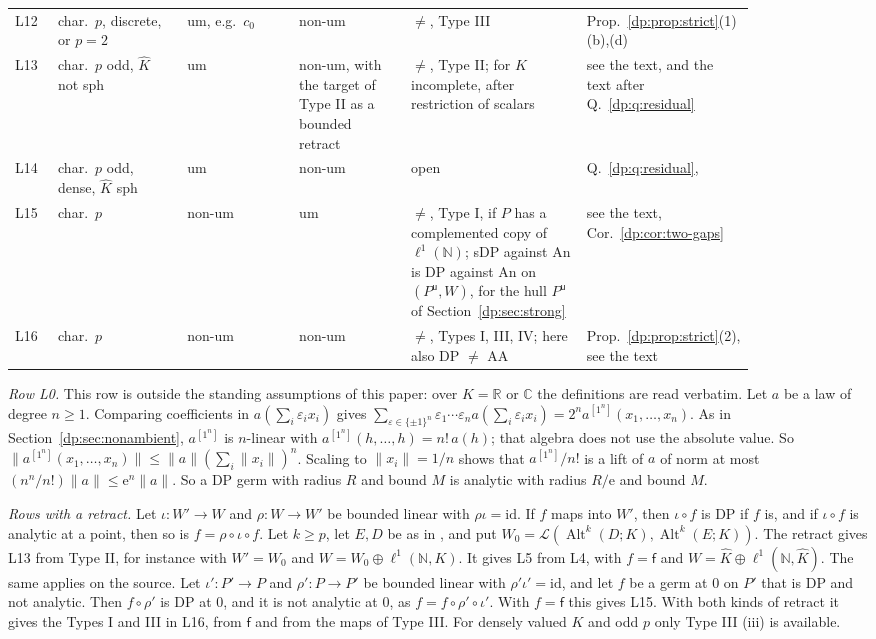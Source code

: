 \documentclass[11pt]{amsart}
\theoremstyle{definition}
\theoremstyle{remark}
\numberwithin{equation}{section}
\newcommand{\N}{\mathbb N}
\newcommand{\cL}{\mathcal L}
\newcommand{\Alt}{\operatorname{Alt}}
\newcommand{\id}{\mathrm{id}}
\newcommand{\norm}[1]{\lVert #1\rVert}
\newcommand{\Kh}{\widehat K}
\theoremstyle{plain}
\theoremstyle{definition}
\theoremstyle{plain}
\begin{document}
\begin{table}[htbp]
\begin{tabular}{@{}p{0.05\linewidth}p{0.155\linewidth}p{0.135\linewidth}p{0.135\linewidth}p{0.195\linewidth}p{0.185\linewidth}@{}}
L12 & char.\ $p$, discrete, or $p=2$ & um, e.g.\ $c_0$ & non-um & $\ne$, Type III & Prop.~\ref{dp:prop:strict}(1)(b),(d)\\
L13 & char.\ $p$ odd, $\Kh$ not sph & um & non-um, with the target of Type II as a bounded retract & $\ne$, Type II; for $K$ incomplete, after restriction of scalars & see the text, and the text after Q.~\ref{dp:q:residual}\\
L14 & char.\ $p$ odd, dense, $\Kh$ sph & um & non-um & open & Q.~\ref{dp:q:residual}, \cite[Remark~E.2]{I}\\
L15 & char.\ $p$ & non-um & um & $\ne$, Type I, if $P$ has a complemented copy of $\ell^1(\N)$; sDP against An is DP against An on $(P^{\mathsf u},W)$, for the hull $P^{\mathsf u}$ of Section~\ref{dp:sec:strong} & see the text, Cor.~\ref{dp:cor:two-gaps}\\
L16 & char.\ $p$ & non-um & non-um & $\ne$, Types I, III, IV; here also DP $\ne$ AA & Prop.~\ref{dp:prop:strict}(2), see the text\\
\end{tabular}
\end{table}

\emph{Row L0.} This row is outside the standing assumptions of this paper: over $K=\mathbb R$ or $\mathbb C$ the definitions are read verbatim. Let $a$ be a law of degree $n\ge1$. Comparing coefficients in $a(\sum_i\varepsilon_ix_i)$ gives $\sum_{\varepsilon\in\{\pm1\}^n}\varepsilon_1\cdots\varepsilon_na(\sum_i\varepsilon_ix_i)=2^na^{[1^n]}(x_1,\dots,x_n)$. As in Section~\ref{dp:sec:nonambient}, $a^{[1^n]}$ is $n$\nobreakdash-linear with $a^{[1^n]}(h,\dots,h)=n!\,a(h)$; that algebra does not use the absolute value. So $\norm{a^{[1^n]}(x_1,\dots,x_n)}\le\norm a(\sum_i\norm{x_i})^n$. Scaling to $\norm{x_i}=1/n$ shows that $a^{[1^n]}/n!$ is a lift of $a$ of norm at most $(n^n/n!)\norm a\le\mathrm e^n\norm a$. So a DP germ with radius $R$ and bound $M$ is analytic with radius $R/\mathrm e$ and bound $M$.

\emph{Rows with a retract.} Let $\iota\colon W'\to W$ and $\rho\colon W\to W'$ be bounded linear with $\rho\iota=\id$. If $f$ maps into $W'$, then $\iota\circ f$ is DP if $f$ is, and if $\iota\circ f$ is analytic at a point, then so is $f=\rho\circ\iota\circ f$. Let $k\ge p$, let $E,D$ be as in \cite[Theorem~7.2(2)]{I}, and put $W_0=\cL(\Alt^k(D;K),\Alt^k(E;K))$. The retract gives L13 from Type II, for instance with $W'=W_0$ and $W=W_0\oplus\ell^1(\N,K)$. It gives L5 from L4, with $f=\mathsf f$ and $W=\Kh\oplus\ell^1(\N,\Kh)$. The same applies on the source. Let $\iota'\colon P'\to P$ and $\rho'\colon P\to P'$ be bounded linear with $\rho'\iota'=\id$, and let $f$ be a germ at $0$ on $P'$ that is DP and not analytic. Then $f\circ\rho'$ is DP at $0$, and it is not analytic at $0$, as $f=f\circ\rho'\circ\iota'$. With $f=\mathsf f$ this gives L15. With both kinds of retract it gives the Types I and III in L16, from $\mathsf f$ and from the maps of Type III. For densely valued $K$ and odd $p$ only Type III (iii) is available.
\end{document}
